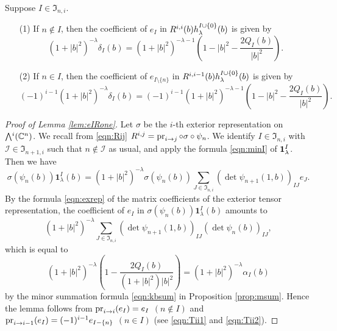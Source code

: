 \begin{lemma}
\label{lem:eIpm-5}
Suppose $I \in {\mathfrak{I}}_{n,i}$.  
\begin{enumerate}
\item[{\rm{(1)}}]
If $n \not \in I$, 
then the coefficient of $e_I$
 in 
$
  R^{{i},{i}} (b) h_{\lambda}^{I \cup \{0\}}(b)
$
is given by 
\[
  (1+|b|^2)^{-\lambda} \delta_I(b)
  =
 (1+|b|^2)^{-\lambda-1}(1-|b|^2-\frac{2Q_I(b)}{|b|^2}).  
\]
\item[{\rm{(2)}}]
If $n \in I$, 
then the coefficient of $e_{I\setminus \{ n \}}$
 in 
$
  R^{{i},{i-1}} (b) h_{\lambda}^{I \cup \{0\}}(b)
$
is given by 
\[
  (-1)^{i-1}(1+|b|^2)^{-\lambda} \delta_I(b)
  = 
  (-1)^{i-1} (1+|b|^2)^{-\lambda-1} (1-|b|^2-\frac{2Q_I(b)}{|b|^2}).  
\]
\end{enumerate}
\end{lemma}



\begin{proof}
[Proof of Lemma \ref{lem:eIRone}]
Let $\sigma$ be the $i$-th exterior representation
 on $\Exterior^i({\mathbb{C}}^n)$.  
We recall from \eqref{eqn:Rij}
 $R^{{i},{j}}=\operatorname{pr}_{{i}\to{j}} \circ \sigma \circ \psi_n$.  
We identify $I \in {\mathfrak{I}}_{n,i}$ with ${\mathcal{I}} \in {\mathfrak{I}}_{n+1,i}$
 such that $n \not \in {\mathcal{I}}$ as usual, 
 and apply the formula \eqref{eqn:minI}
 of ${\bf{1}}_{\lambda}^I$.  
Then we have
\[
  \sigma(\psi_n(b)) {\mathbf{1}}_{\lambda}^{I}(b)
=
(1+|b|^2)^{-\lambda}
\sigma(\psi_n(b))
\sum_{J \in {\mathfrak{I}}_{n,i}} (\det \psi_{n+1}(1,b))_{I J} e_{J}.  
\]
By the formula \eqref{eqn:exrep}
 of the matrix coefficients of the exterior tensor representation, 
 the coefficient of $e_I$ 
 in $\sigma(\psi_n(b)) {\mathbf{1}}_{\lambda}^{I}(b)$
 amounts to 
\[
   (1+|b|^2)^{-\lambda}
   \sum_{J \in {\mathfrak {I}}_{n,i}}
   (\det \psi_{n+1}(1,b))_{I J}
   (\det \psi_n(b))_{I J},   
\]
which is equal to 
\[
  (1+|b|^2)^{-\lambda}(1-\frac{2Q_I(b)}{(1+|b|^2)|b|^2})
   =
   (1+|b|^2)^{-\lambda} \alpha_I(b)
\]
by the minor summation formula \eqref{eqn:kbsum}
 in Proposition \ref{prop:msum}.  
Hence the lemma follows from $\operatorname{pr}_{{i}\to{i}} (e_I) = e_I$ $(n \notin I)$
 and $\operatorname{pr}_{{i}\to{i-1}} (e_I) = (-1)^{i-1}e_{I-\{n\}}$ $(n \in I)$
 (see \eqref{eqn:Tii1} and \eqref{eqn:Tii2}).  
\end{proof}



